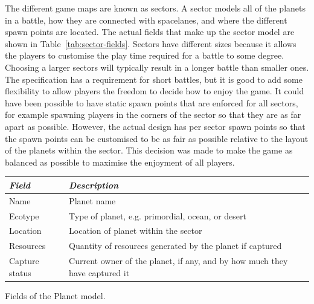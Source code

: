 The different game maps are known as sectors. A sector models all of the planets in a battle, how they are connected with spacelanes, and where the different spawn points are located. The actual fields that make up the sector model are shown in Table~\ref{tab:sector-fields}. Sectors have different sizes because it allows the players to customise the play time required for a battle to some degree. Choosing a larger sectors will typically result in a longer battle than smaller ones. The specification has a requirement for short battles, but it is good to add some flexibility to allow players the freedom to decide how to enjoy the game. It could have been possible to have static spawn points that are enforced for all sectors, for example spawning players in the corners of the sector so that they are as far apart as possible. However, the actual design has per sector spawn points so that the spawn points can be customised to be as fair as possible relative to the layout of the planets within the sector. This decision was made to make the game as balanced as possible to maximise the enjoyment of all players.



\begin{margintable}
    \begin{tabular}{p{4em} p{11em}}
    \toprule
    \emph{Field} & \emph{Description} \\
    \midrule
    Name & Planet name \\
    Ecotype & Type of planet, e.g. primordial, ocean, or desert \\
    Location & Location of planet within the sector \\
    Resources & Quantity of resources generated by the planet if captured \\
    Capture status & Current owner of the planet, if any, and by how much they have captured it \\
    \bottomrule
    \end{tabular}
    \vspace{1em}
    \caption[Fields of the Planet model]{Fields of the Planet model.}
    \label{tab:planet-fields}
\end{margintable}

